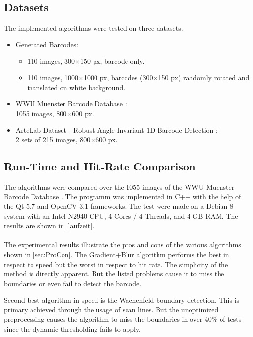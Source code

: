 \subsection{Datasets}
The implemented algorithms were tested on three datasets.
\begin{itemize}
\item Generated Barcodes:
\begin{itemize}
\item 110 images, 300$\times$150 px, barcode only.
\item 110 images, 1000$\times$1000 px, barcodes (300$\times$150 px) randomly rotated and translated on white background.
\end{itemize}
\item WWU Muenster Barcode Database \cite{MuensterBarcodeDB} \citep{wachenfeld2008robust}:\\
1055 images, 800$\times$600 px.
\item ArteLab Dataset - Robust Angle Invariant 1D Barcode Detection \cite{ArteLabDB} \cite{zamberletti2010neural} \citep{zamberletti2013robust}:\\
2 sets of 215 images, 800$\times$600 px.
\end{itemize}

\subsection{Run-Time and Hit-Rate Comparison}
The algorithms were compared over the 1055 images of the WWU Muenster Barcode Database \citep{MuensterBarcodeDB}. The programm was implemented in C++ with the help of the Qt 5.7 and OpenCV 3.1 frameworks. The test were made on a Debian 8 system with an Intel N2940 CPU, 4 Cores / 4 Threads, and 4 GB RAM. The results are shown in \cref{laufzeit}.
\\
\\
The experimental results illustrate the pros and cons of the various algorithms shown in \cref{sec:ProCon}. The Gradient+Blur algorithm performs the best in respect to speed but the worst in respect to hit rate. The simplicity of the method is directly apparent. But the listed problems cause it to miss the boundaries or even fail to detect the barcode.

Second best algorithm in speed is the Wachenfeld boundary detection. This is primary achieved through the usage of scan lines. But the unoptimized preprocessing causes the algorithm to miss the boundaries in over 40\% of tests since the dynamic thresholding fails to apply.

